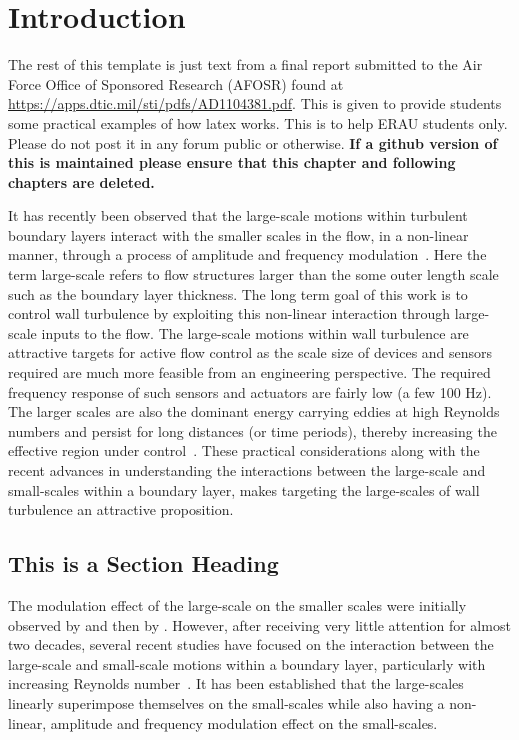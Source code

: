 \chapter{Introduction}

The rest of this template is just text from a final report submitted to the Air Force Office of Sponsored Research (AFOSR) found at \url{https://apps.dtic.mil/sti/pdfs/AD1104381.pdf}. This is given to provide students some practical examples of how latex works. This is to help ERAU students only. Please do not post it in any forum public or otherwise. \textbf{If a github version of this is maintained please ensure that this chapter and following chapters are deleted.}

It has recently been observed that the large-scale motions within turbulent boundary layers interact with the smaller scales in the flow, in a non-linear manner, through a process of amplitude and frequency modulation~\citep{Mathis2009a,Mathis2009b,Jacobi2013a,Smits2011a,Marusic2010a,Marusic2010b}. Here the term large-scale refers to flow structures larger than the some outer length scale such as the boundary layer thickness. The long term goal of this work is to control wall turbulence by exploiting this non-linear interaction through large-scale inputs to the flow. The large-scale motions within wall turbulence are attractive targets for active flow control as the scale size of devices and sensors required are much more feasible from an engineering perspective. The required frequency response of such sensors and actuators are fairly low (a few 100 Hz). The larger scales are also the dominant energy carrying eddies at high Reynolds numbers and persist for long distances (or time periods), thereby increasing the effective region under control~\citep{Smits2011a}. These practical considerations along with the recent advances in understanding the interactions between the large-scale and small-scales within a boundary layer, makes targeting the large-scales of wall turbulence an attractive proposition. 

\section{This is a Section Heading}
The modulation effect of the large-scale on the smaller scales were initially observed by \citet{Brown1977a} and then by \citet{Bandyopadhyay1984a}. However, after receiving very little attention for almost two decades, several recent studies have focused on the interaction between the large-scale and small-scale motions within a boundary layer, particularly with increasing Reynolds number~\citep{Mathis2009a,Mathis2009b,Chung2010a,Marusic2010a,Guala2011a,Bernardini2011a,Ganapathisubramani2012a,Jacobi2013a,Harun2013a,Agostini2014a,Talluru2014b,Baars2015a}. It has been established that the large-scales linearly superimpose themselves on the small-scales while also having a non-linear, amplitude and frequency modulation effect on the small-scales. 

